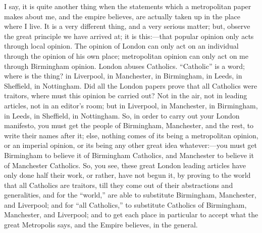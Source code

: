 I say, it is quite another thing when the statements
which a metropolitan paper makes about me, and the empire
believes, are actually taken up in the place where I
live. It is a very different thing, and a very serious
matter; but, observe the great principle we have arrived
at; it is this:—that popular opinion only acts
through local opinion. The opinion of London can only act
on an individual through the opinion of his own place;
metropolitan opinion can only act on me through
Birmingham opinion. London abuses Catholics.
``Catholic'' is a word; where is the thing? in
Liverpool, in Manchester, in Birmingham, in Leeds, in
Sheffield, in Nottingham. Did all the London papers prove
that all Catholics were traitors, where must this opinion
be carried out? Not in the air, not in leading articles,
not in an editor's room; but in Liverpool, in Manchester,
in Birmingham, in Leeds, in Sheffield, in Nottingham. So,
in order to carry out your London manifesto, you must get
the people of Birmingham, Manchester, and the rest, to
write their names after it; else, nothing comes of its
being a metropolitan opinion, or an imperial opinion, or
its being any other great idea whatever:—you must
get Birmingham to believe it of Birmingham Catholics, and
Manchester to believe it of Manchester Catholics. So, you
see, these great London leading articles have only done
half their work, or rather, have not begun it, by proving
to the world that all Catholics are traitors, till they
come out of their abstractions and generalities, and for
the ``world,'' are able to substitute Birmingham,
Manchester, and Liverpool; and for ``all
Catholics,'' to substitute Catholics of Birmingham,
Manchester, and Liverpool; and to get each place in
particular to accept what the great Metropolis says, and
the Empire believes, in the general.

